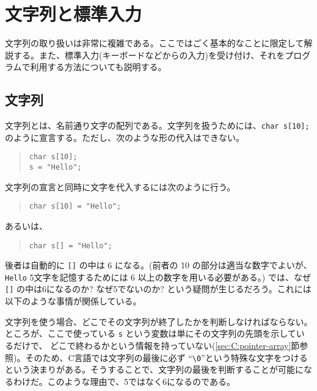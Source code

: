 \section{文字列と標準入力}
文字列の取り扱いは非常に複雑である。ここではごく基本的なことに限定して解説する。また、標準入力(キーボードなどからの入力)を受け付け、それをプログラムで利用する方法についても説明する。

\subsection{文字列}
文字列とは、名前通り文字の配列である。文字列を扱うためには、\texttt{char s[10];} のように宣言する。ただし、次のような形の代入はできない。
\begin{quote}
    \begin{verbatim}
char s[10];
s = "Hello";
\end{verbatim}
\end{quote}
文字列の宣言と同時に文字を代入するには次のように行う。
\begin{quote}
    \begin{verbatim}
char s[10] = "Hello";
\end{verbatim}
\end{quote}
あるいは、
\begin{quote}
    \begin{verbatim}
char s[] = "Hello";
\end{verbatim}
\end{quote}
後者は自動的に \texttt{[]} の中は 6 になる。(前者の 10 の部分は適当な数字でよいが、\texttt{Hello} 5文字を記憶するためには 6 以上の数字を用いる必要がある。) では、なぜ \texttt{[]} の中は6になるのか? なぜ5でないのか? という疑問が生じるだろう。これには以下のような事情が関係している。

文字列を使う場合、どこでその文字列が終了したかを判断しなければならない。ところが、ここで使っている \texttt{s} という変数は単にその文字列の先頭を示しているだけで、
どこで終わるかという情報を持っていない(\ref{sec:C:pointer-array}節参照)。そのため、C言語では文字列の最後に必ず ``\texttt{\textbackslash 0}''という特殊な文字をつけるという決まりがある。そうすることで、文字列の最後を判断することが可能になるわけだ。このような理由で、5ではなく6になるのである。
\begin{figure}[H]
    \centering
\end{figure}

